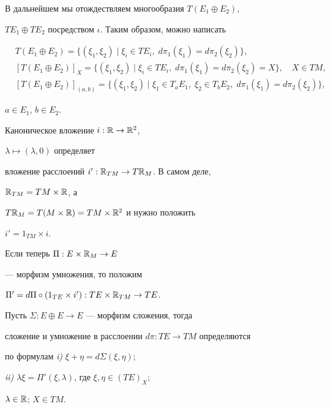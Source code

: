 В дальнейшем мы отождествляем многообразия $T(E_1\oplus E_2)$, 


$TE_1\oplus TE_2$ посредством $\iota$. Таким образом, можно написать 


\begin{align*} 


&T(E_1\oplus E_2)=\{(\xi_1,\xi_2)\mid\xi_i\in TE_i,\; 


d\pi_1(\xi_1)=d\pi_2(\xi_2)\}, \\ 


&[T(E_1\oplus E_2)]_X=\{(\xi_1,\xi_2)\mid\xi_i\in TE_i,\; 


d\pi_1(\xi_1)=d\pi_2(\xi_2)=X\},\quad X\in TM, \\ 


&[T(E_1\oplus E_2)]_{(a,b)}=\{(\xi_1,\xi_2)\mid\xi_1\in T_a E_1,\; 


\xi_2\in T_b E_2,\;d\pi_1(\xi_1)=d\pi_2(\xi_2)\}, 


\end{align*} 


$a\in E_1$, $b\in E_2$. 


 


Каноническое вложение $i:\Bbb R\to\Bbb R^2$, 


$\lambda\mapsto(\lambda,0)$ определяет 


вложение расслоений $i':\Bbb R_{TM}\to T\Bbb R_M$. В самом деле,


$\Bbb R_{TM}=TM\times\Bbb R$, а 


$T\Bbb R_M=T(M\times\Bbb R)=TM\times\Bbb R^2$ и нужно положить 


$i'=1_{TM}\times i$. 


Если теперь $\Pi:E\times\Bbb R_M\to E$ 


--- морфизм умножения, то положим 


$\Pi'=d\Pi\circ(1_{TE}\times i'):TE\times\Bbb R_{TM}\to TE$. 


 


\begin{thms} Пусть $\Sigma:E\oplus E\to E$ --- морфизм сложения, тогда 


сложение и умножение в расслоении $d\pi:TE\to TM$ определяются 


по формулам {\em i)} $\xi+\eta=d\Sigma(\xi,\eta)$; 


{\em ii)} $\lambda\xi=\Pi'(\xi,\lambda)$, где $\xi,\eta\in(TE)_X$; 


$\lambda\in\Bbb R$; $X\in TM$. 


\end{thms} 


